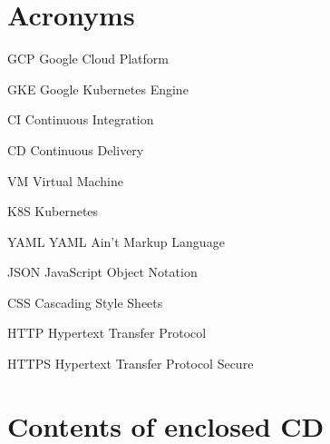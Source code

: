 \documentclass[thesis=B,english]{FITthesis}[2019/12/23]
\begin{document}




\appendix

\chapter{Acronyms}
\begin{description}
	\item{GCP} Google Cloud Platform
	\item{GKE} Google Kubernetes Engine
	\item{CI} Continuous Integration
	\item{CD} Continuous Delivery
	\item{VM} Virtual Machine
	\item{K8S} Kubernetes
	\item{YAML} YAML Ain't Markup Language
	\item{JSON} JavaScript Object Notation
	\item{CSS} Cascading Style Sheets
	\item{HTTP} Hypertext Transfer Protocol
	\item{HTTPS} Hypertext Transfer Protocol Secure
	
\end{description}


\chapter{Contents of enclosed CD}


\begin{figure}
\end{figure}
\end{document}
